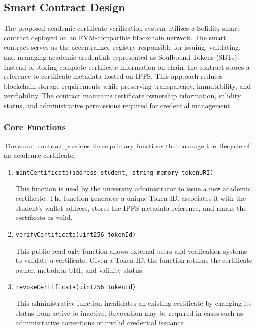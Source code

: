 \subsection{Smart Contract Design}

The proposed academic certificate verification system utilizes a Solidity smart contract deployed on an EVM-compatible blockchain network. The smart contract serves as the decentralized registry responsible for issuing, validating, and managing academic credentials represented as Soulbound Tokens (SBTs).\\

Instead of storing complete certificate information on-chain, the contract stores a reference to certificate metadata hosted on IPFS. This approach reduces blockchain storage requirements while preserving transparency, immutability, and verifiability. The contract maintains certificate ownership information, validity status, and administrative permissions required for credential management.

\subsubsection{Core Functions}
The smart contract provides three primary functions that manage the lifecycle of an academic certificate.

\begin{enumerate}
    \item \texttt{mintCertificate(address student, string memory tokenURI)}

          This function is used by the university administrator to issue a new academic certificate. The function generates a unique Token ID, associates it with the student's wallet address, stores the IPFS metadata reference, and marks the certificate as valid.

    \item \texttt{verifyCertificate(uint256 tokenId)}

          This public read-only function allows external users and verification systems to validate a certificate. Given a Token ID, the function returns the certificate owner, metadata URI, and validity status.

    \item \texttt{revokeCertificate(uint256 tokenId)}

          This administrative function invalidates an existing certificate by changing its status from active to inactive. Revocation may be required in cases such as administrative corrections or invalid credential issuance.
\end{enumerate}

